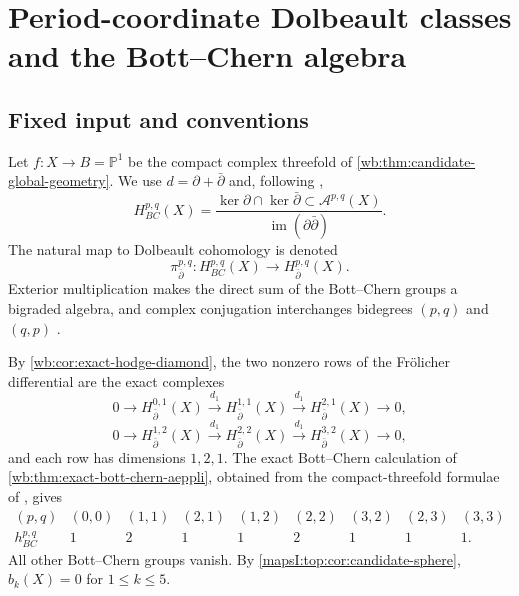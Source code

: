 \section{Period-coordinate Dolbeault classes and the Bott--Chern algebra}
\label{wb:sec:bcpr-product-structure}

\subsection{Fixed input and conventions}

Let $f\colon X\to B=\mathbb P^1$ be the compact complex threefold of
\cref{wb:thm:candidate-global-geometry}.  We use
$d=\partial+\bar\partial$ and, following
\cite[\S1.a]{Schweitzer2007},
\begin{equation}
 H^{p,q}_{BC}(X)=
 \frac{\ker\partial\cap\ker\bar\partial
       \subset\mathcal A^{p,q}(X)}
      {\operatorname{im}(\partial\bar\partial)}.
\label{wb:eq:bcpr-bc-definition}
\end{equation}
The natural map to Dolbeault cohomology is denoted
\begin{equation}
 \pi_{\bar\partial}^{p,q}\colon H^{p,q}_{BC}(X)
 \longrightarrow H^{p,q}_{\bar\partial}(X).
\label{wb:eq:bcpr-dolbeault-map}
\end{equation}
Exterior multiplication makes the direct sum of the Bott--Chern groups a
bigraded algebra, and complex conjugation interchanges bidegrees $(p,q)$
and $(q,p)$ \cite[\S1.a]{Schweitzer2007}.

By \cref{wb:cor:exact-hodge-diamond}, the two nonzero rows of the
Fr\"olicher differential are the exact complexes
\begin{equation}
 0\longrightarrow H^{0,1}_{\bar\partial}(X)
 \xrightarrow{d_1}H^{1,1}_{\bar\partial}(X)
 \xrightarrow{d_1}H^{2,1}_{\bar\partial}(X)
 \longrightarrow0,
\label{wb:eq:bcpr-hodge-row-one}
\end{equation}
\begin{equation}
 0\longrightarrow H^{1,2}_{\bar\partial}(X)
 \xrightarrow{d_1}H^{2,2}_{\bar\partial}(X)
 \xrightarrow{d_1}H^{3,2}_{\bar\partial}(X)
 \longrightarrow0,
\label{wb:eq:bcpr-hodge-row-two}
\end{equation}
and each row has dimensions $1,2,1$.  The exact Bott--Chern calculation
of \cref{wb:thm:exact-bott-chern-aeppli}, obtained from the compact-threefold
formulae of \cite{McHugh2018}, gives
\begin{equation}
\begin{array}{c|cccccccc}
(p,q)&(0,0)&(1,1)&(2,1)&(1,2)&(2,2)&(3,2)&(2,3)&(3,3)\\ \hline
h^{p,q}_{BC}&1&2&1&1&2&1&1&1.
\end{array}
\label{wb:eq:bcpr-nonzero-dimensions}
\end{equation}
All other Bott--Chern groups vanish.  By
\cref{mapsI:top:cor:candidate-sphere}, $b_k(X)=0$ for $1\leq k\leq5$.

